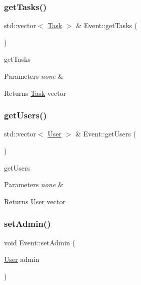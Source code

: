 \subsubsection{\texorpdfstring{get\+Tasks()}{getTasks()}}
{\footnotesize\ttfamily std\+::vector$<$ \mbox{\hyperlink{class_task}{Task}} $>$ \& Event\+::get\+Tasks (\begin{DoxyParamCaption}{ }\end{DoxyParamCaption})}

get\+Tasks 
\begin{DoxyParams}{Parameters}
{\em none} & \\
\hline
\end{DoxyParams}
\begin{DoxyReturn}{Returns}
\mbox{\hyperlink{class_task}{Task}} vector 
\end{DoxyReturn}
\mbox{\label{class_event_a254ee56527f75c441b5eee8c078f3c04}} 
\subsubsection{\texorpdfstring{get\+Users()}{getUsers()}}
{\footnotesize\ttfamily std\+::vector$<$ \mbox{\hyperlink{class_user}{User}} $>$ \& Event\+::get\+Users (\begin{DoxyParamCaption}{ }\end{DoxyParamCaption})}

get\+Users 
\begin{DoxyParams}{Parameters}
{\em none} & \\
\hline
\end{DoxyParams}
\begin{DoxyReturn}{Returns}
\mbox{\hyperlink{class_user}{User}} vector 
\end{DoxyReturn}
\mbox{\label{class_event_ae64a2062b6e4f673d81efbc6bc98c210}} 
\subsubsection{\texorpdfstring{set\+Admin()}{setAdmin()}}
{\footnotesize\ttfamily void Event\+::set\+Admin (\begin{DoxyParamCaption}\item[{\mbox{\hyperlink{class_user}{User}}}]{admin }\end{DoxyParamCaption})}


